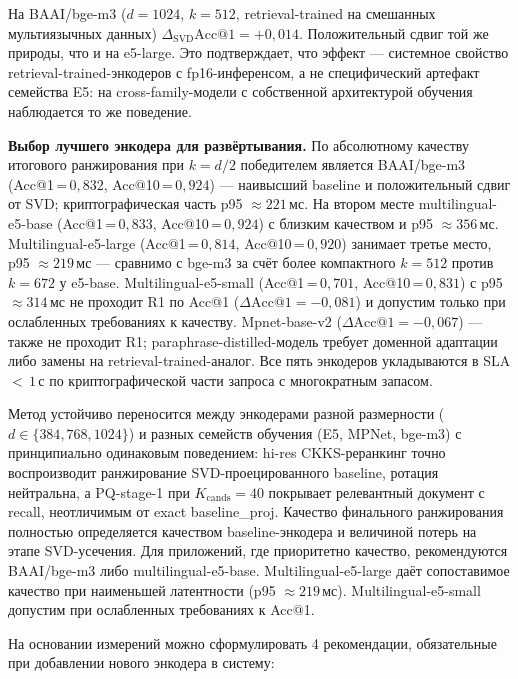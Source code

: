 \documentclass[a4paper, 12pt, oneside, openany]{article}
\begin{document}
На BAAI/bge-m3 ($d = 1024$, $k = 512$, retrieval-trained на смешанных мультиязычных данных) $\Delta_{\mathrm{SVD}}\mathrm{Acc@1} = +0{,}014$. Положительный сдвиг той же природы, что и на e5-large. Это подтверждает, что эффект --- системное свойство retrieval-trained-энкодеров с fp16-инференсом, а не специфический артефакт семейства E5: на cross-family-модели с собственной архитектурой обучения наблюдается то же поведение.

\textbf{Выбор лучшего энкодера для развёртывания.} По абсолютному качеству итогового ранжирования при $k = d/2$ победителем является BAAI/bge-m3 (Acc@1\,=\,$0{,}832$, Acc@10\,=\,$0{,}924$) --- наивысший baseline и положительный сдвиг от SVD; криптографическая часть p95 $\approx 221$\,мс. На втором месте multilingual-e5-base (Acc@1\,=\,$0{,}833$, Acc@10\,=\,$0{,}924$) с близким качеством и p95 $\approx 356$\,мс. Multilingual-e5-large (Acc@1\,=\,$0{,}814$, Acc@10\,=\,$0{,}920$) занимает третье место, p95 $\approx 219$\,мс --- сравнимо с bge-m3 за счёт более компактного $k = 512$ против $k = 672$ у e5-base. Multilingual-e5-small (Acc@1\,=\,$0{,}701$, Acc@10\,=\,$0{,}831$) с p95 $\approx 314$\,мс не проходит R1 по Acc@1 ($\Delta\mathrm{Acc@1} = -0{,}081$) и допустим только при ослабленных требованиях к качеству. Mpnet-base-v2 ($\Delta\mathrm{Acc@1} = -0{,}067$) --- также не проходит R1; paraphrase-distilled-модель требует доменной адаптации либо замены на retrieval-trained-аналог. Все пять энкодеров укладываются в SLA $<\,1$\,с по криптографической части запроса с многократным запасом.

Метод устойчиво переносится между энкодерами разной размерности ($d \in \{384, 768, 1024\}$) и разных семейств обучения (E5, MPNet, bge-m3) с принципиально одинаковым поведением: hi-res CKKS-реранкинг точно воспроизводит ранжирование SVD-проецированного baseline, ротация нейтральна, а PQ-stage-1 при $K_{\mathrm{cands}} = 40$ покрывает релевантный документ с recall, неотличимым от exact baseline\_proj. Качество финального ранжирования полностью определяется качеством baseline-энкодера и величиной потерь на этапе SVD-усечения. Для приложений, где приоритетно качество, рекомендуются BAAI/bge-m3 либо multilingual-e5-base. Multilingual-e5-large даёт сопоставимое качество при наименьшей латентности (p95 $\approx 219$\,мс). Multilingual-e5-small допустим при ослабленных требованиях к Acc@1.

 На основании измерений можно сформулировать 4 рекомендации, обязательные при добавлении нового энкодера в систему:
\end{document}
